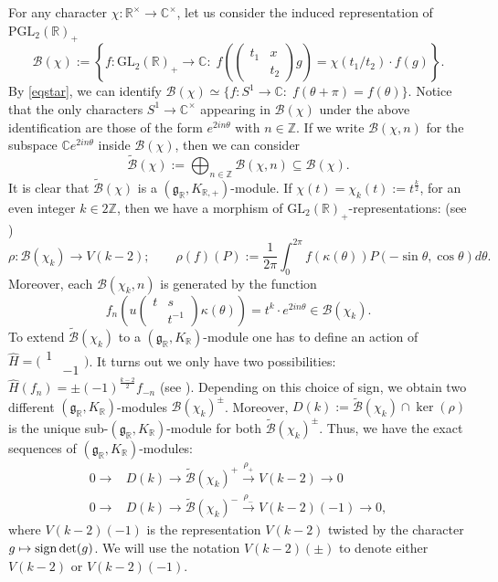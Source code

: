 \documentclass{amsart}
\theoremstyle{definition}
\theoremstyle{remark}
\numberwithin{equation}{section}
\newcommand{\PGL}{{\mathrm{PGL}}}
\newcommand{\GL}{{\mathrm{GL}}}
\newcommand{\Z}{{\mathbb Z}}
\newcommand{\C}{{\mathbb C}}
\newcommand{\R}{{\mathbb R}}
\newcommand{\cB}{{\mathcal B}}
\newcommand{\mfg}{{\mathfrak g}}
\begin{document}
For any character $\chi:\R^\times\rightarrow\C^\times$, let us consider the induced representation of $\PGL_2(\R)_+$
\[
\cB(\chi):=\left\{f:\GL_2(\R)_+\rightarrow\C:\;f\left(\left(\begin{array}{cc}t_1&x\\&t_2\end{array}\right)g\right)=\chi(t_1/t_2)\cdot f(g)\right\}.
\]
By \eqref{eqstar}, we can identify
$\cB(\chi)\simeq\{f:S^1\rightarrow\C:\;f(\theta+\pi)= f(\theta)\}$.
Notice that the only characters $S^1\rightarrow\C^\times$ appearing in $\cB(\chi)$ under the above identification are those of the form $e^{2in\theta}$ with $n\in\Z$. If we write $\cB(\chi,n)$ for the subspace $\C e^{2in\theta}$ inside $\cB(\chi)$, then we can consider
\[
\tilde \cB(\chi):=\bigoplus_{n\in\Z}\cB(\chi,n)\subseteq \cB(\chi).
\] 
It is clear that $\tilde\cB(\chi)$ is a $(\mfg_\R,K_{\R,+})$-module.
If $\chi(t)=\chi_k(t):=t^{\frac{k}{2}}$, for an even integer $k\in 2\Z$, then we have a morphism of $\GL_2(\R)_+$-representations: (see \cite[proposition 4.2]{preprintsanti2})
\[
\rho:\cB(\chi_k)\longrightarrow V(k-2); \qquad \rho(f)(P):=\frac{1}{2\pi}\int_{0}^{2\pi}f(\kappa(\theta))P(-\sin\theta,\cos\theta)d\theta.
\]
Moreover, each $\cB(\chi_k,n)$ is generated  by the function %
\begin{equation}\label{fn}
f_n\left(u\left(\begin{array}{cc}t&s\\&t^{-1}\end{array}\right)\kappa(\theta)\right)=t^k\cdot e^{2in\theta}\in\cB(\chi_k).
\end{equation}
To extend $\tilde \cB(\chi_k)$ to a $(\mfg_\R,K_\R)$-module one has to define an action of $\hat H=\big(\begin{smallmatrix}1&\\&-1\end{smallmatrix}\big)$. It turns out we only have two possibilities: $\hat H(f_n)=\pm(-1)^{\frac{k-2}{2}} f_{-n}$  (see \cite[\S 1.3]{ESsanti}). Depending on this choice of sign, we obtain two different $(\mfg_\R,K_\R)$-modules  $\cB(\chi_k)^\pm$. Moreover, $D(k) :=\tilde \cB(\chi_k)\cap \ker(\rho) $ is the unique sub-$(\mfg_\R,K_\R)$-module for both $\tilde\cB(\chi_k)^\pm$. Thus, we have the exact sequences of $(\mfg_\R,K_\R)$-modules:
\begin{align}
0\longrightarrow  &D(k)\longrightarrow \tilde \cB(\chi_k)^+\stackrel{\rho_+}{\longrightarrow} V(k-2)\longrightarrow 0 \label{eq:exs1}\\
0\longrightarrow &D(k)\longrightarrow \tilde \cB(\chi_k)^-\stackrel{\rho_-}{\longrightarrow} V(k-2)(-1)\longrightarrow 0,\label{eq:exs2}
\end{align}
where $V(k-2)(-1)$ is the representation $V(k-2)$ twisted by the character $g\mapsto{\rm sign}\det(g)$. We will use the notation $V(k-2)(\pm)$ to denote either $V(k-2)$ or $V(k-2)(-1)$.
\end{document}
